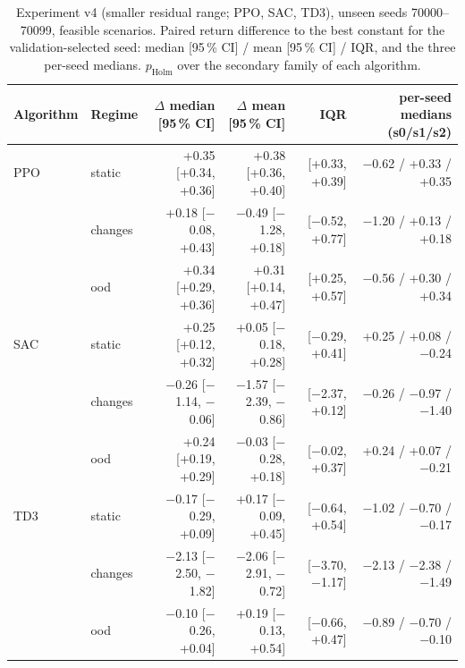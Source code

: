 \begin{table}[t]
\centering
\small
\caption{Experiment v4 (smaller residual range; PPO, SAC, TD3), unseen seeds 70000--70099, feasible scenarios. Paired return difference to the best constant for the validation-selected seed: median [95\,\% CI] / mean [95\,\% CI] / IQR, and the three per-seed medians. $p_{\mathrm{Holm}}$ over the secondary family of each algorithm.}
\label{tab:v4}
\begin{tabular}{llrrrr}
\toprule
Algorithm & Regime & $\Delta$ median [95\,\% CI] & $\Delta$ mean [95\,\% CI] & IQR & per-seed medians (s0/s1/s2)\\
\midrule
PPO & static & +0.35 [+0.34, +0.36] & +0.38 [+0.36, +0.40] & [+0.33, +0.39] & $-$0.62 / +0.33 / +0.35\\
 & changes & +0.18 [$-$0.08, +0.43] & $-$0.49 [$-$1.28, +0.18] & [$-$0.52, +0.77] & $-$1.20 / +0.13 / +0.18\\
 & ood & +0.34 [+0.29, +0.36] & +0.31 [+0.14, +0.47] & [+0.25, +0.57] & $-$0.56 / +0.30 / +0.34\\
\midrule
SAC & static & +0.25 [+0.12, +0.32] & +0.05 [$-$0.18, +0.28] & [$-$0.29, +0.41] & +0.25 / +0.08 / $-$0.24\\
 & changes & $-$0.26 [$-$1.14, $-$0.06] & $-$1.57 [$-$2.39, $-$0.86] & [$-$2.37, +0.12] & $-$0.26 / $-$0.97 / $-$1.40\\
 & ood & +0.24 [+0.19, +0.29] & $-$0.03 [$-$0.28, +0.18] & [$-$0.02, +0.37] & +0.24 / +0.07 / $-$0.21\\
\midrule
TD3 & static & $-$0.17 [$-$0.29, +0.09] & +0.17 [$-$0.09, +0.45] & [$-$0.64, +0.54] & $-$1.02 / $-$0.70 / $-$0.17\\
 & changes & $-$2.13 [$-$2.50, $-$1.82] & $-$2.06 [$-$2.91, $-$0.72] & [$-$3.70, $-$1.17] & $-$2.13 / $-$2.38 / $-$1.49\\
 & ood & $-$0.10 [$-$0.26, +0.04] & +0.19 [$-$0.13, +0.54] & [$-$0.66, +0.47] & $-$0.89 / $-$0.70 / $-$0.10\\
\bottomrule
\end{tabular}
\end{table}
